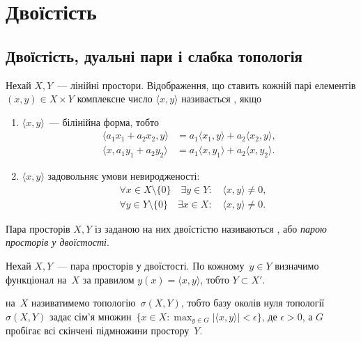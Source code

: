 \chapter{Двоїстість}

\section{Двоїстість, дуальні пари і слабка топологія}

\begin{definition}
    Нехай $X, Y$~--- лінійні простори. Відображення, що ставить кожній парі елементів $(x, y) \in X \times Y$ комплексне число $\langle x, y\rangle$ називається , якщо
    \begin{enumerate}
        \item $\langle x, y \rangle$~--- білінійна форма, тобто
        \begin{align*}
            \langle a_1 x_1 + a_2 x_2, y \rangle &= a_1 \langle x_1, y \rangle + a_2 \langle x_2, y \rangle, \\
            \langle x, a_1 y_1 + a_2 y_2 \rangle &= a_1 \langle x, y_1 \rangle + a_2 \langle x, y_2 \rangle.
        \end{align*}
        \item $\langle x, y \rangle$ задовольняє умови невиродженості:
        \begin{align*}
            & \forall x \in X \setminus \{0\} \quad \exists y \in Y: \quad \langle x, y \rangle \ne 0, \\
            & \forall y \in Y \setminus \{0\} \quad \exists x \in X: \quad \langle x, y \rangle \ne 0.
        \end{align*}
    \end{enumerate}
\end{definition}

\begin{definition}
    Пара просторів $X, Y$ із заданою на них двоїстістю називаються , або \emph{парою просторів у двоїстості}.
\end{definition}

\begin{definition}
    Нехай $X, Y$~--- пара просторів у двоїстості. По кожному~$y \in Y$ визначимо функціонал на~$X$ за правилом $y(x) = \langle x, y \rangle$, тобто $Y \subset X'$.

     на~$X$ називатимемо топологію~$\sigma(X, Y)$, тобто базу околів нуля топології~$\sigma(X, Y)$ задає сім'я множин~$\{x \in X: \max_{y \in G} |\langle x, y \rangle| < \epsilon\}$, де $\epsilon > 0$, а $G$ пробігає всі скінчені підмножини простору~$Y$.
\end{definition}

